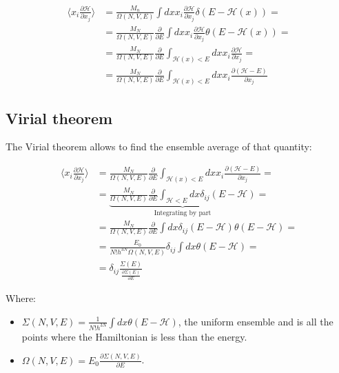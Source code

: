 	\begin{align*}
		\biggl\langle x_i\frac{\partial\mathcal{H}}{\partial x_j}\biggr\rangle &= \frac{M_n}{\Omega(N, V, E)}\int dxx_i\frac{\partial\mathcal{H}}{\partial x_j}\delta(E-\mathcal{H}(x))=\\
																																					 &=\frac{M_N}{\Omega(N, V, E)}\frac{\partial}{\partial E}\int dxx_i\frac{\partial\mathcal{H}}{\partial x_j}\theta(E-\mathcal{H}(x)) =\\
																																					 &=\frac{M_N}{\Omega(N, V, E)}\frac{\partial}{\partial E}\int_{\mathcal{H}(x)<E}dxx_i\frac{\partial\mathcal{H}}{\partial x_j} = \\
																																					 &=\frac{M_N}{\Omega(N, V, E)}\frac{\partial}{\partial E}\int_{\mathcal{H}(x)<E}dxx_i\frac{\partial(\mathcal{H}-E)}{\partial x_j}
	\end{align*}

	\subsection{Virial theorem}
	The Virial theorem allows to find the ensemble average of that quantity:

	\begin{align*}
		\biggl\langle x_i\frac{\partial\mathcal{H}}{\partial x_j}\biggr\rangle &= \frac{M_N}{\Omega(N, V, E)}\frac{\partial}{\partial E}\int_{\mathcal{H}(x)< E}dxx_i\frac{\partial(\mathcal{H}-E)}{\partial x_j} = \\
																																					 &=\underbrace{\frac{M_N}{\Omega(N, V, E)}\frac{\partial}{\partial E}\int_{\mathcal{H}<E} dx\delta_{ij}(E-\mathcal{H})}_{\text{Integrating by part}} = \\
																																					 &=\frac{M_N}{\Omega(N, V, E)}\frac{\partial}{\partial E}\int dx\delta_{ij}(E-\mathcal{H})\theta(E-\mathcal{H}) = \\
																																					 &=\frac{E_0}{N!h^{3N}\Omega(N, V, E)}\delta_{ij}\int dx\theta(E-\mathcal{H}) =\\
																																					 &= \delta_{ij}\frac{\Sigma(E)}{\frac{\partial\Sigma(E)}{\partial E}}
	\end{align*}

	Where:

	\begin{multicols}{2}
		\begin{itemize}
			\item $\Sigma(N, V, E) = \frac{1}{N!h^{3N}}\int dx\theta(E-\mathcal{H})$, the uniform ensemble and is all the points where the Hamiltonian is less than the energy.
			\item $\Omega(N, V, E) = E_0\frac{\partial\Sigma(N, V, E)}{\partial E}$.
		\end{itemize}
	\end{multicols}

